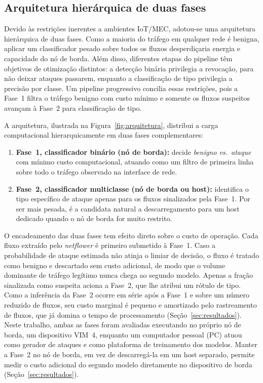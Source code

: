\documentclass[12pt,a4paper]{article}
\begin{document}
\subsection{Arquitetura hierárquica de duas fases}
\label{subsec:arquitetura}

Devido às restrições inerentes a ambientes IoT/MEC, adotou-se uma arquitetura
hierárquica de duas fases. Como a maioria do tráfego em qualquer rede é benigna,
aplicar um classificador pesado sobre todos os fluxos desperdiçaria energia e
capacidade do nó de borda. Além disso, diferentes etapas do pipeline têm
objetivos de otimização distintos: a detecção binária privilegia a revocação,
para não deixar ataques passarem, enquanto a classificação de tipo privilegia a
precisão por classe. Um pipeline progressivo concilia essas restrições, pois a
Fase~1 filtra o tráfego benigno com custo mínimo e somente os fluxos suspeitos
avançam à Fase~2 para classificação de tipo.

A arquitetura, ilustrada na Figura~\ref{fig:arquitetura}, distribui a carga
computacional hierarquicamente em duas fases complementares:

\begin{enumerate}
  \item \textbf{Fase~1, classificador binário (nó de borda):} decide
    \textit{benigno vs.\ ataque} com mínimo custo computacional, atuando como um
    filtro de primeira linha sobre todo o tráfego observado na interface de rede.
  \item \textbf{Fase~2, classificador multiclasse (nó de borda ou host):}
    identifica o tipo específico de ataque apenas para os fluxos sinalizados pela
    Fase~1. Por ser mais pesada, é a candidata natural a descarregamento para um
    host dedicado quando o nó de borda for muito restrito.
\end{enumerate}

O encadeamento das duas fases tem efeito direto sobre o custo de operação. Cada
fluxo extraído pelo \textit{netflower} é primeiro submetido à Fase~1. Caso a
probabilidade de ataque estimada não atinja o limiar de decisão, o fluxo é
tratado como benigno e descartado sem custo adicional, de modo que o volume
dominante de tráfego legítimo nunca chega ao segundo modelo. Apenas a fração
sinalizada como suspeita aciona a Fase~2, que lhe atribui um rótulo de tipo.
Como a inferência da Fase~2 ocorre em série após a Fase~1 e sobre um número
reduzido de fluxos, seu custo marginal é pequeno e amortizado pelo rastreamento
de fluxos, que já domina o tempo de processamento
(Seção~\ref{sec:resultados}). Neste trabalho, ambas as fases foram avaliadas
executando no próprio nó de borda, um dispositivo VIM~4, enquanto um computador
pessoal (PC) atuou como gerador de ataques e como plataforma de treinamento dos
modelos. Manter a Fase~2 no nó de borda, em vez de descarregá-la em um host
separado, permite medir o custo adicional do segundo modelo diretamente no
dispositivo de borda (Seção~\ref{sec:resultados}).
\end{document}
